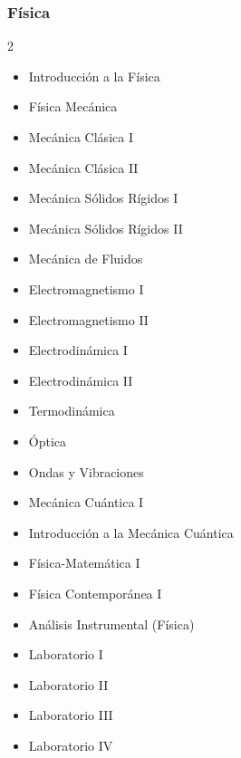 \documentclass[12pt,a4paper]{article}
\begin{document}
	\subsubsection{Física}
	\begin{multicols}{2}
		\begin{itemize}
			\item Introducción a la Física
			\item Física Mecánica
			\item Mecánica Clásica I
			\item Mecánica Clásica II
			\item Mecánica Sólidos Rígidos I
			\item Mecánica Sólidos Rígidos II
			\item Mecánica de Fluidos
			\item Electromagnetismo I
			\item Electromagnetismo II
			\item Electrodinámica I
			\item Electrodinámica II
			\item Termodinámica
			\item Óptica
			\item Ondas y Vibraciones
			\item Mecánica Cuántica I
			\item Introducción a la Mecánica Cuántica
			\item Física-Matemática I
			\item Física Contemporánea I
			\item Análisis Instrumental (Física)
			\item Laboratorio I
			\item Laboratorio II
			\item Laboratorio III
			\item Laboratorio IV
		\end{itemize}
	\end{multicols}
	
\end{document}
